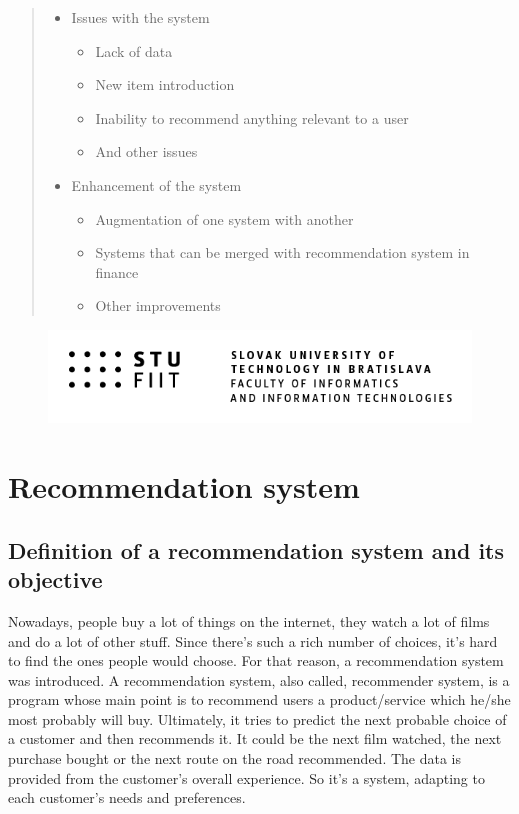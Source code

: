 \documentclass[10pt,twoside,english,a4paper]{article}
\begin{document}
\begin{abstract}
\begin{itemize}
    \item Issues with the system
    \begin{itemize}
        \item Lack of data
        \item New item introduction
        \item Inability to recommend anything relevant to a user
        \item And other issues
    \end{itemize}
    
    \item Enhancement of the system
    \begin{itemize}
        \item Augmentation of one system with another
        \item Systems that can be merged with recommendation system in finance
        \item Other improvements
    \end{itemize}\cite{arch_rec_sys}
\end{itemize}


\end{abstract}
\newpage
\tableofcontents

\begin{figure}[h!]
    \centering
    \includegraphics[width=1\textwidth]{STU-FIIT-anch}
\end{figure}

\newpage






\section{Recommendation system}

\subsection{Definition of a recommendation system and its objective}
Nowadays, people buy a lot of things on the internet, they watch a lot of films and do a lot of other stuff. Since there's such a rich number of choices, it's hard to find the ones people would choose. For that reason, a recommendation system was introduced. A recommendation system, also called, recommender system, is a program whose main point is to recommend users a product/service which he/she most probably will buy. Ultimately, it tries to predict the next probable choice of a customer and then recommends it. It could be the next film watched, the next purchase bought or the next route on the road recommended. The data is provided from the customer's overall experience. So it's a system, adapting to each customer's needs and preferences.\cite{vars_rec_sys}
\end{document}

